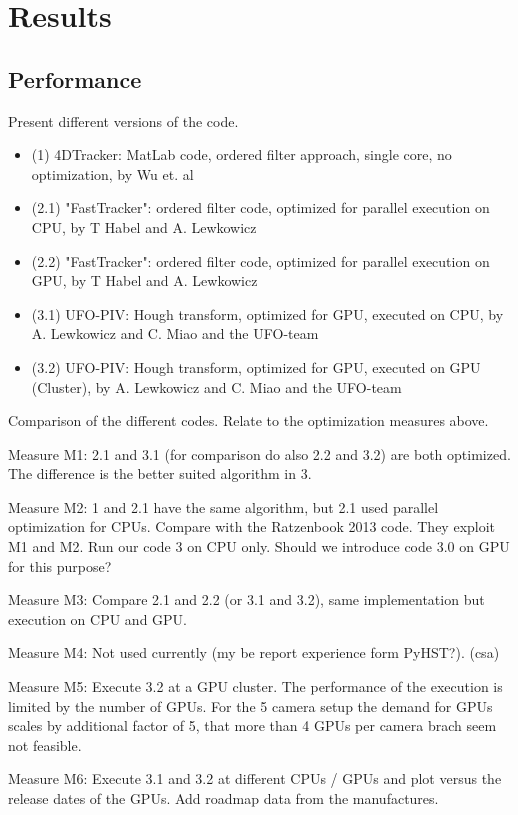 \documentclass[11pt,draft]{amsart}
\begin{document}
\section{Results}

\subsection{Performance}

Present different versions of the code.

\begin{itemize}
\item (1) 4DTracker: MatLab code, ordered filter approach, single core, no optimization, by Wu et. al
\item (2.1) "FastTracker": ordered filter code, optimized for parallel execution on CPU, by T Habel and A. Lewkowicz
\item (2.2) "FastTracker": ordered filter code, optimized for parallel execution on GPU, by T Habel and A. Lewkowicz
\item (3.1) UFO-PIV: Hough transform, optimized for GPU, executed on CPU, by A. Lewkowicz and C. Miao and the UFO-team
\item (3.2) UFO-PIV: Hough transform, optimized for GPU, executed on GPU (Cluster), by A. Lewkowicz and C. Miao and the UFO-team
\end{itemize}

Comparison of the different codes. Relate to the optimization measures above. 

Measure M1: 2.1 and 3.1 (for comparison do also 2.2 and 3.2) are both optimized. The difference is the better suited algorithm in 3. 

Measure M2: 1 and 2.1 have the same algorithm, but 2.1 used parallel optimization for CPUs. 
Compare with the Ratzenbook 2013 code. They exploit M1 and M2. Run our code 3 on CPU only.
Should we introduce code 3.0 on GPU for this purpose?

Measure M3: Compare 2.1 and 2.2 (or 3.1 and 3.2), same implementation but execution on CPU and GPU. 

Measure M4: Not used currently (my be report experience form PyHST?). (csa)

Measure M5: Execute 3.2 at a GPU cluster. The performance of the execution is limited by the number of GPUs. For the 5 camera setup the demand for GPUs scales by additional factor of 5, that more than 4 GPUs per camera brach seem not feasible. 

Measure M6: Execute 3.1 and 3.2 at different CPUs / GPUs and plot versus the release dates of the GPUs. Add roadmap data from the manufactures. 
\end{document}
